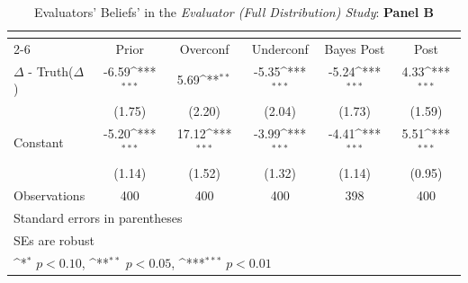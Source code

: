 \begin{table}[htbp]\centering
\def\sym#1{\ifmmode^{#1}\else\(^{#1}\)\fi}
\caption{Evaluators' Beliefs' in the \textit{Evaluator (Full Distribution) Study}: \textbf{Panel B}}
\begin{tabular}{l*{5}{c}}
\hline\hline
                &\multicolumn{5}{c}{}                                                                          \\\cmidrule(lr){2-6}
                &\multicolumn{1}{c}{Prior}&\multicolumn{1}{c}{Overconf}&\multicolumn{1}{c}{Underconf}&\multicolumn{1}{c}{Bayes Post}&\multicolumn{1}{c}{Post}\\
\hline
$\Delta$ - Truth($\Delta$)&    -6.59\sym{***}&     5.69\sym{**} &    -5.35\sym{***}&    -5.24\sym{***}&     4.33\sym{***}\\
                &   (1.75)         &   (2.20)         &   (2.04)         &   (1.73)         &   (1.59)         \\
Constant        &    -5.20\sym{***}&    17.12\sym{***}&    -3.99\sym{***}&    -4.41\sym{***}&     5.51\sym{***}\\
                &   (1.14)         &   (1.52)         &   (1.32)         &   (1.14)         &   (0.95)         \\
\hline
Observations    &      400         &      400         &      400         &      398         &      400         \\
\hline\hline
\multicolumn{6}{l}{\footnotesize Standard errors in parentheses}\\
\multicolumn{6}{l}{\footnotesize SEs are robust}\\
\multicolumn{6}{l}{\footnotesize \sym{*} \(p<0.10\), \sym{**} \(p<0.05\), \sym{***} \(p<0.01\)}\\
\end{tabular}
\end{table}
